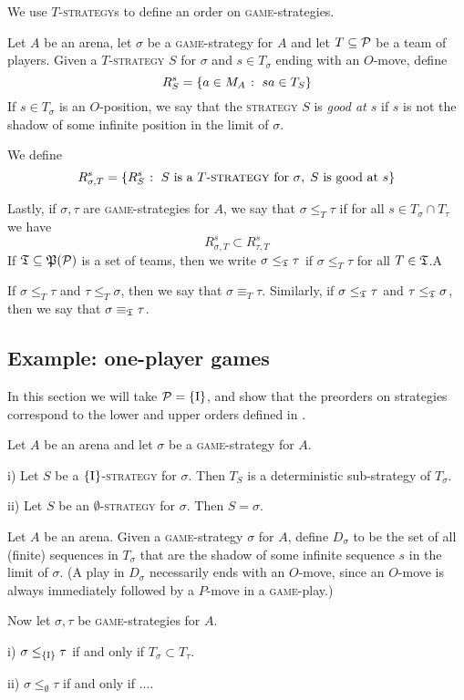 \documentclass{article}
\newcommand{\game}{\textsc{game}}
\newcommand{\strategy}{\textsc{strategy}}
\begin{document}
We use $T$-\strategy{}s to define an order on \game{}-strategies.  

\begin{definition}
  Let $A$ be an arena, let $\sigma$ be a \game{}-strategy for $A$ and let $T\subset\P$ be a team of players.  
  Given a $T$-\strategy{} $S$ for $\sigma$ and $s\in T_\sigma$ ending with an $O$-move, define
  \[
    R_S^s = \{a\in M_A\suchthat sa\in T_S\}
    \]
  If $s\in T_\sigma$ is an $O$-position, we say that the \strategy{} $S$ is \emph{good at $s$} if $s$ is not the shadow of some infinite position in the limit of $\sigma$.  

  We define
  \[
    R_{\sigma,T}^s = \{R_S^s\suchthat \textrm{$S$ is a $T$-\strategy{} for $\sigma$},\;\textrm{$S$ is good at $s$}\}
    \]

  Lastly, if $\sigma,\tau$ are \game{}-strategies for $A$, we say that $\sigma\le_T\tau$ if for all $s\in T_\sigma\cap T_\tau$ we have
  \[
    R_{\sigma,T}^s\subset R_{\tau,T}^s
    \]
  If $\T\subset\power(\P)$ is a set of teams, then we write $\sigma\le_{\T}\tau$ if $\sigma\le_T\tau$ for all $T\in\T$.A

  If $\sigma\le_T\tau$ and $\tau\le_T\sigma$, then we say that $\sigma\equiv_T\tau$.  
  Similarly, if $\sigma\le_{\T}\tau$ and $\tau\le_{\T}\sigma$, then we say that $\sigma\equiv_{\T}\tau$.  
\end{definition}

\subsection{Example: one-player games}

In this section we will take $\P=\{\RN{1}\}$, and show that the preorders on strategies correspond to the lower and upper orders defined in \cite{mcCHFiniteND}.

\begin{lemma}
  \label{lemma:guy}
  Let $A$ be an arena and let $\sigma$ be a \game{}-strategy for $A$.  

  i) Let $S$ be a $\{\RN{1}\}$-\strategy{} for $\sigma$.  
  Then $T_S$ is a deterministic sub-strategy of $T_\sigma$.  

  ii) Let $S$ be an $\emptyset$-\strategy{} for $\sigma$.  
  Then $S=\sigma$.
\end{lemma}

\begin{proposition}
  Let $A$ be an arena.  
  Given a \game{}-strategy $\sigma$ for $A$, define $D_\sigma$ to be the set of all (finite) sequences in $T_\sigma$ that are the shadow of some infinite sequence $s$ in the limit of $\sigma$.  
  (A play in $D_\sigma$ necessarily ends with an $O$-move, since an $O$-move is always immediately followed by a $P$-move in a \game{}-play.)

  Now let $\sigma,\tau$ be \game{}-strategies for $A$.  

  i) $\sigma \le_{\{\RN{1}\}} \tau$ if and only if $T_\sigma\subset T_\tau$.  

  ii) $\sigma \le_{\emptyset} \tau$ if and only if ....
\end{proposition}
\end{document}
